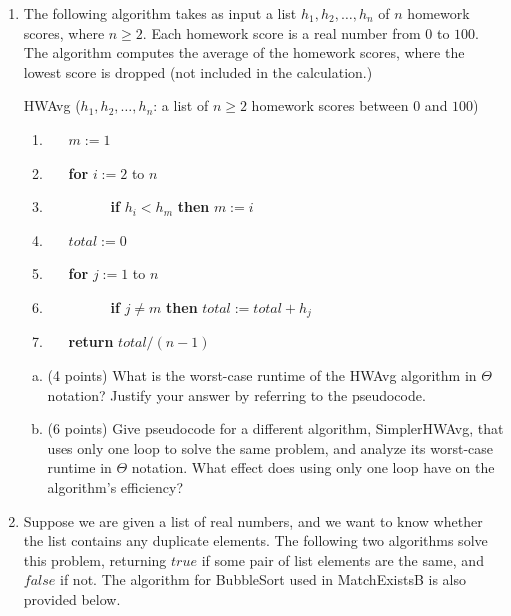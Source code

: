 \documentclass[11pt,letterpaper,unboxed,cm]{hmcpset}
\begin{document}
\begin{enumerate}
\begin{enumerate}[(a)]
\end{enumerate}

\bigskip
\item The following algorithm takes as input a list $h_1, h_2, \dots, h_n$ of $n$ homework scores, where $n\geq 2$. Each homework score is a real number from $0$ to $100$. The algorithm computes the average of the homework scores, where the lowest score is dropped (not included in the calculation.)

 HWAvg ($h_1, h_2, \dots, h_n$: a list of $n\geq2$ homework scores between $0$ and $100$)
\begin{enumerate}[1.]
\item ~~~$m:=1$
\item ~~~{\bf for} $i := 2$ to $n$
\item ~~~~~~~~~{\bf if} $h_i<h_m$ {\bf then} $m:=i$
\item ~~~$total:=0$
\item ~~~{\bf for} $j := 1$ to $n$
\item ~~~~~~~~~{\bf if} $j \neq m$ {\bf then} $total:=total+h_j$
\item ~~~{\bf return} $total/(n-1)$
\end{enumerate}

\begin{enumerate}[(a)]
\item  (4 points) What is the worst-case runtime of the HWAvg algorithm in $\Theta$ notation? Justify your answer by referring to the pseudocode.



\item  (6 points) Give pseudocode for a different algorithm, SimplerHWAvg, that uses only one loop to solve the same problem, and analyze its worst-case runtime in $\Theta$ notation. What effect does using only one loop have on the algorithm's efficiency?



\end{enumerate}



\bigskip
\item Suppose we are given a list of real numbers, and we want to know whether the list contains any duplicate elements. The following two algorithms solve this problem, returning $true$ if some pair of list elements are the same, and $false$ if not. The algorithm for BubbleSort used in MatchExistsB is also provided below.


\end{enumerate}
\end{document}
